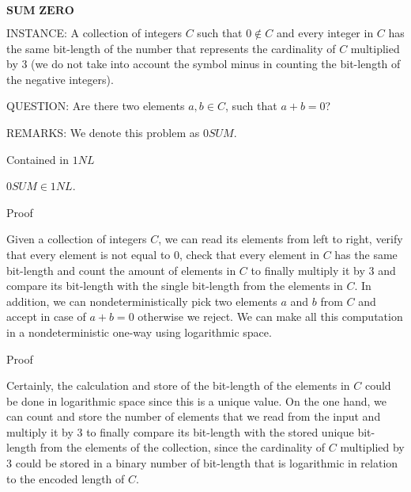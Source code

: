 \documentclass[11pt]{beamer}
\begin{document}
\begin{frame}{$\textbf{SUM ZERO}$}

\begin{definition}
INSTANCE: A collection of integers $C$ such that $0 \notin C$ and every integer in $C$ has the same bit-length of the number that represents the cardinality of $C$ multiplied by $3$ (we do not take into account the symbol minus in counting the bit-length of the negative integers).

QUESTION: Are there two elements $a, b \in C$, such that $a + b = 0$?

REMARKS: We denote this problem as $0SUM$.
\end{definition}

\end{frame}

\begin{frame}{Contained in $1NL$}

\begin{theorem}
\label{1nl}
$0SUM \in 1NL$.
\end{theorem}

\end{frame}

\begin{frame}{Proof}

Given a collection of integers $C$, we can read its elements from left to right, verify that every element is not equal to $0$, check that every element in $C$ has the same bit-length and count the amount of elements in $C$ to finally multiply it by $3$ and compare its bit-length with the single bit-length from the elements in $C$. In addition, we can nondeterministically pick two elements $a$ and $b$ from $C$ and accept in case of $a + b = 0$ otherwise we reject. We can make all this computation in a nondeterministic one-way using logarithmic space.

\end{frame}

\begin{frame}{Proof}

Certainly, the calculation and store of the bit-length of the elements in $C$ could be done in logarithmic space since this is a unique value. On the one hand, we can count and store the number of elements that we read from the input and multiply it by $3$ to finally compare its bit-length with the stored unique bit-length from the elements of the collection, since the cardinality of $C$ multiplied by $3$ could be stored in a binary number of bit-length that is logarithmic in relation to the encoded length of $C$.

\end{frame}
\end{document}
